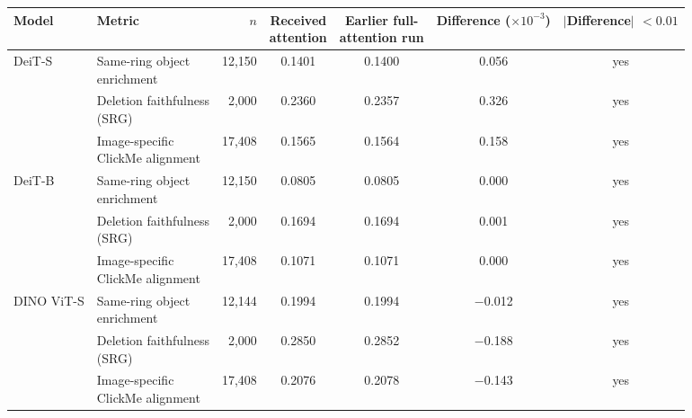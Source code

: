 \begin{tabular}{llrcccc}
\toprule
Model & Metric & $n$ & \makecell{Received\\attention} & \makecell{Earlier full-\\attention run} & \makecell{Difference\\($\times 10^{-3}$)} & \makecell{$|$Difference$|$\\$< 0.01$} \\
\midrule
DeiT-S & \makecell[l]{Same-ring object \\ enrichment} & 12,150 & 0.1401 & 0.1400 & 0.056 & yes \\
\addlinespace[2pt]
 & \makecell[l]{Deletion faithfulness \\ (SRG)} & 2,000 & 0.2360 & 0.2357 & 0.326 & yes \\
\addlinespace[2pt]
 & \makecell[l]{Image-specific \\ ClickMe alignment} & 17,408 & 0.1565 & 0.1564 & 0.158 & yes \\
\addlinespace[2pt]
DeiT-B & \makecell[l]{Same-ring object \\ enrichment} & 12,150 & 0.0805 & 0.0805 & 0.000 & yes \\
\addlinespace[2pt]
 & \makecell[l]{Deletion faithfulness \\ (SRG)} & 2,000 & 0.1694 & 0.1694 & 0.001 & yes \\
\addlinespace[2pt]
 & \makecell[l]{Image-specific \\ ClickMe alignment} & 17,408 & 0.1071 & 0.1071 & 0.000 & yes \\
\addlinespace[2pt]
DINO ViT-S & \makecell[l]{Same-ring object \\ enrichment} & 12,144 & 0.1994 & 0.1994 & $-$0.012 & yes \\
\addlinespace[2pt]
 & \makecell[l]{Deletion faithfulness \\ (SRG)} & 2,000 & 0.2850 & 0.2852 & $-$0.188 & yes \\
\addlinespace[2pt]
 & \makecell[l]{Image-specific \\ ClickMe alignment} & 17,408 & 0.2076 & 0.2078 & $-$0.143 & yes \\
\bottomrule
\end{tabular}

